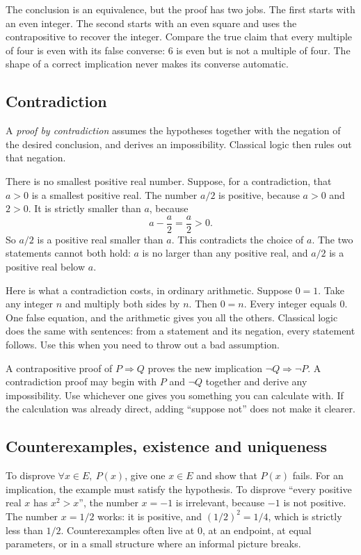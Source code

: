 The conclusion is an equivalence, but the proof has two jobs. The first
starts with an even integer. The second starts with an even square and uses
the contrapositive to recover the integer. Compare the true claim that
every multiple of four is even with its false converse: $6$ is even but
is not a multiple of four. The shape of a correct implication never
makes its converse automatic.

\subsection*{Contradiction}

A \emph{proof by contradiction} assumes the hypotheses together with the negation of the desired conclusion, and derives an impossibility. Classical logic then rules out that negation.

There is no smallest positive real number. Suppose, for a contradiction, that $a>0$ is a smallest positive real. The number $a/2$ is positive, because $a>0$ and $2>0$. It is strictly smaller than $a$, because
\[
a-\frac{a}{2}=\frac{a}{2}>0.
\]
So $a/2$ is a positive real smaller than $a$. This contradicts the choice of $a$. The two statements cannot both hold: $a$ is no larger than any positive real, and $a/2$ is a positive real below $a$.

Here is what a contradiction costs, in ordinary arithmetic. Suppose $0=1$. Take any integer $n$ and multiply both sides by $n$. Then $0=n$. Every integer equals $0$. One false equation, and the arithmetic gives you all the others. Classical logic does the same with sentences: from a statement and its negation, every statement follows. Use this when you need to throw out a bad assumption.

A contrapositive proof of $P\Rightarrow Q$ proves the new implication $\neg Q\Rightarrow\neg P$. A contradiction proof may begin with $P$ and $\neg Q$ together and derive any impossibility. Use whichever one gives you something you can calculate with. If the calculation was already direct, adding ``suppose not'' does not make it clearer.

\subsection*{Counterexamples, existence and uniqueness}

To disprove $\forall x\in E,\ P(x)$, give one $x\in E$ and show that $P(x)$ fails. For an implication, the example must satisfy the hypothesis. To disprove ``every positive real $x$ has $x^2>x$'', the number $x=-1$ is irrelevant, because $-1$ is not positive. The number $x=1/2$ works: it is positive, and $(1/2)^2=1/4$, which is strictly less than $1/2$. Counterexamples often live at $0$, at an endpoint, at equal parameters, or in a small structure where an informal picture breaks.

